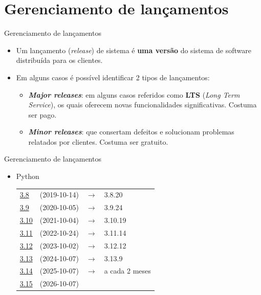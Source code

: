 \documentclass{beamer}
\begin{document}
\section{Gerenciamento de lançamentos}

\begin{frame}{Gerenciamento de lançamentos}
	\begin{itemize}
		\justifying
		\item Um lançamento (\textit{release}) de sistema é \textbf{uma versão} do sistema de software distribuída para os clientes.
		\item Em alguns casos é possível identificar 2 tipos de lançamentos:
		\begin{itemize}
			\justifying
			\item \textit{\textbf{Major releases}}: em alguns casos referidos como \textbf{LTS} (\textit{Long Term Service}), os quais oferecem novas funcionalidades significativas. Costuma ser pago.
			\item \textit{\textbf{Minor releases}}: que consertam defeitos e solucionam problemas relatados por clientes. Costuma ser gratuito.
		\end{itemize}
	\end{itemize}
\end{frame}

\begin{frame}{Gerenciamento de lançamentos}
	\begin{itemize}
		\item Python
		
		\begin{tabular}{lccl}
			\href{https://peps.python.org/pep-0569/}{3.8} & (2019-10-14) & $\rightarrow$ & 3.8.20 \\
			\href{https://peps.python.org/pep-0596/}{3.9} & (2020-10-05) & $\rightarrow$ & 3.9.24\\
			\href{https://peps.python.org/pep-0619/}{3.10} & (2021-10-04) & $\rightarrow$ & 3.10.19\\
			\href{https://peps.python.org/pep-0664/}{3.11} & (2022-10-24) & $\rightarrow$ & 3.11.14\\
			\href{https://peps.python.org/pep-0693/}{3.12} & (2023-10-02) & $\rightarrow$ & 3.12.12\\
			\href{https://peps.python.org/pep-0719/}{3.13} & (2024-10-07) & $\rightarrow$ & 3.13.9 \\
			\href{https://peps.python.org/pep-0745/}{3.14} & (2025-10-07) & $\rightarrow$ & a cada 2 meses\\
			\href{https://peps.python.org/pep-0790/}{3.15} & (2026-10-07) &  & \\
		\end{tabular}
	\end{itemize}
\end{frame}
\end{document}
